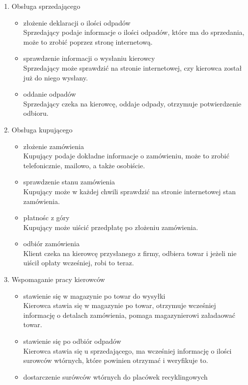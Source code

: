
\begin{enumerate}
	\item Obsługa sprzedającego
		\begin{itemize}
		\item złożenie deklaracji o ilości odpadów \\
		Sprzedający podaje informacje o ilości odpadów, które ma do sprzedania, może to zrobić poprzez stronę internetową.
		\item sprawdzenie informacji o wysłaniu kierowcy \\
		Sprzedający może sprawdzić na stronie internetowej, czy kierowca został już do niego wysłany.
		\item oddanie odpadów \\
		Sprzedający czeka na kierowcę, oddaje odpady, otrzymuje potwierdzenie odbioru.
		\end{itemize}
	\item Obsługa kupującego
		\begin{itemize}
		\item złożenie zamówienia  \\
		Kupujący podaje dokładne informacje o zamówieniu, może to zrobić telefonicznie, mailowo, a także osobiście.
		\item sprawdzenie stanu zamówienia \\
		Kupujący może w każdej chwili sprawdzić na stronie internetowej stan zamówienia.
		\item płatnośc z góry \\
		Kupujący może uiścić przedpłatę po złożeniu zamówienia.
		\item odbiór zamówienia \\
		Klient czeka na kierowcę przysłanego z firmy, odbiera towar i jeżeli nie uiścił opłaty wcześniej, robi to teraz.
		\end{itemize}
	\item Wspomaganie pracy kierowców
		\begin{itemize}
		\item stawienie się w magazynie po towar do wysyłki \\
		Kierowca stawia się w magazynie po towar, otrzymuje wcześniej informację o detalach zamówienia, pomaga magazynierowi załadaować towar.
		\item stawienie się po odbiór odpadów \\
		Kierowca stawia się u sprzedającego, ma wcześniej informację o ilości surowców wtórnych, które powinien otrzymać i weryfikuje to.
		\item dostarczenie surówców wtórnych do placówek recyklingowych \\

\end{itemize}
\end{enumerate}
